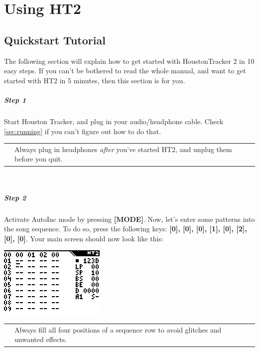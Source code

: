 \documentclass[12pt]{report}	%
\newcommand*{\TakeFourierOrnament}[1]{{%
\fontencoding{U}\fontfamily{futs}\selectfont\char#1}}
\newcommand*{\danger}{\TakeFourierOrnament{66}}
\begin{document}
\chapter{Using HT2}
\section{Quickstart Tutorial}
The following section will explain how to get started with HoustonTracker 2 in 10 easy steps. If you can't be bothered to read the whole manual, and want to get started with HT2 in 5 minutes, then this section is for you.

\paragraph{Step 1} Start Houston Tracker, and plug in your audio/headphone cable. Check \autoref{sec:running} if you can't figure out how to do that.

\begin{tabularx}{\textwidth}{m{} X}
\textcolor{red}{\newline\Huge\danger} & Always plug in headphones \emph{after} you've started HT2, and unplug them before you quit. \\
\end{tabularx} ~\\

\paragraph{Step 2} Activate AutoInc mode by pressing \textbf{[MODE]}. Now, let's enter some patterns into the song sequence. To do so, press the following keys: \textbf{[0], [0], [0], [1], [0], [2], [0], [0]}. Your main screen should now look like this:

{\includegraphics{tut1}} \newline

\begin{tabularx}{\textwidth}{m{} X}
\textcolor{red}{\newline\Huge\danger} & Always fill all four positions of a sequence row to avoid glitches and unwanted effects. \\
\end{tabularx} ~\\
\end{document}
